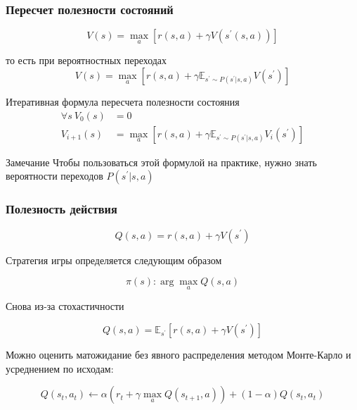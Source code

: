 \documentclass[fullscreen=true, bookmarks=true, hyperref={pdfencoding=unicode}]{beamer}
\begin{document}
\begin{frame}
  \frametitle{Пересчет полезности состояний}

  $$V(s) = \max\limits_a [r(s, a) + \gamma V(s^\prime (s, a))]$$

  \vspace{0.5cm}
  то есть при вероятностных переходах
  $$V(s) = \max\limits_a [r(s, a) + \gamma \mathbb{E}_{s^\prime \sim P(s^\prime | s, a)} V(s^\prime)]$$

  \vspace{0.5cm}
  Итеративная формула пересчета полезности состояния
  \begin{align*}
    \forall s \ V_0(s) &= 0 \\
    V_{i+1}(s) &= \max\limits_a [r(s, a) + \gamma \mathbb{E}_{s^\prime \sim P(s^\prime | s, a)} V_{i}(s^\prime)]
  \end{align*}
  \pause
  \begin{block}{Замечание}
    Чтобы пользоваться этой формулой на практике,
    нужно знать вероятности переходов $P(s^\prime| s, a)$
  \end{block}

\end{frame}


\begin{frame}
  \frametitle{Полезность действия}

  $$Q(s, a) = r(s, a) + \gamma V(s^\prime)$$

  Стратегия игры определяется следующим образом

  $$\pi(s) : \arg\max\limits_a Q(s, a)$$

  \pause
  Снова из-за стохастичности

  $$Q(s, a) = \mathbb{E}_{s^\prime} [r(s, a) + \gamma V(s^\prime)]$$

  Можно оценить матожидание без явного распределения методом Монте-Карло и усреднением по исходам:

  $$Q(s_t, a_t) \leftarrow \alpha \left(r_t+\gamma \max\limits_a Q(s_{t+1}, a) \right)
  + (1-\alpha) Q(s_{t}, a_{t})$$

\end{frame}
\end{document}
